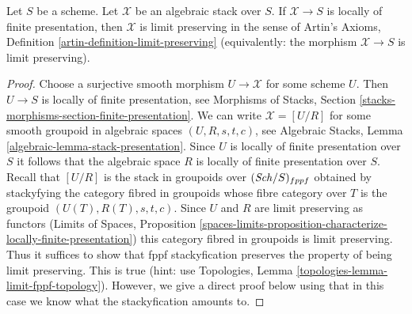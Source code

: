 \begin{lemma}
\label{lemma-locally-finite-presentation-limit-preserving}
Let $S$ be a scheme. Let $\mathcal{X}$ be an algebraic stack
over $S$. If $\mathcal{X} \to S$ is locally of finite presentation,
then $\mathcal{X}$ is limit preserving in the sense of
Artin's Axioms, Definition \ref{artin-definition-limit-preserving}
(equivalently: the morphism $\mathcal{X} \to S$ is limit preserving).
\end{lemma}

\begin{proof}
Choose a surjective smooth morphism $U \to \mathcal{X}$ for some scheme $U$.
Then $U \to S$ is locally of finite presentation, see
Morphisms of Stacks, Section
\ref{stacks-morphisms-section-finite-presentation}.
We can write $\mathcal{X} = [U/R]$ for some smooth groupoid in
algebraic spaces $(U, R, s, t, c)$, see
Algebraic Stacks, Lemma \ref{algebraic-lemma-stack-presentation}.
Since $U$ is locally of finite presentation over $S$
it follows that the algebraic space $R$ is
locally of finite presentation over $S$.
Recall that $[U/R]$ is the stack in groupoids over $(\mathit{Sch}/S)_{fppf}$
obtained by stackyfying the category fibred in groupoids
whose fibre category over $T$ is the groupoid $(U(T), R(T), s, t, c)$.
Since $U$ and $R$ are limit preserving as functors
(Limits of Spaces, Proposition
\ref{spaces-limits-proposition-characterize-locally-finite-presentation})
this category fibred in groupoids is limit preserving.
Thus it suffices to show that fppf stackyfication preserves
the property of being limit preserving. This is true
(hint: use Topologies, Lemma
\ref{topologies-lemma-limit-fppf-topology}).
However, we give a direct proof below using that in this
case we know what the stackyfication amounts to.


\end{proof}
